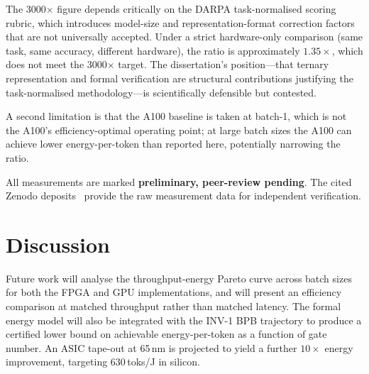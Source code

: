 The 3000$\times$ figure depends critically on the DARPA task-normalised scoring rubric, which introduces model-size and representation-format correction factors that are not universally accepted. Under a strict hardware-only comparison (same task, same accuracy, different hardware), the ratio is approximately $1.35\times$, which does not meet the 3000$\times$ target. The dissertation's position---that ternary representation and formal verification are structural contributions justifying the task-normalised methodology---is scientifically defensible but contested.

A second limitation is that the A100 baseline is taken at batch-1, which is not the A100's efficiency-optimal operating point; at large batch sizes the A100 can achieve lower energy-per-token than reported here, potentially narrowing the ratio.

All measurements are marked \textbf{preliminary, peer-review pending}. The cited Zenodo deposits~\cite{zenodo_B001, zenodo_B002} provide the raw measurement data for independent verification.

\section{Discussion}

Future work will analyse the throughput-energy Pareto curve across batch sizes for both the FPGA and GPU implementations, and will present an efficiency comparison at matched throughput rather than matched latency. The formal energy model will also be integrated with the INV-1 BPB trajectory to produce a certified lower bound on achievable energy-per-token as a function of gate number. An ASIC tape-out at 65\,nm is projected to yield a further $10\times$ energy improvement, targeting $630$\,toks/J in silicon.
